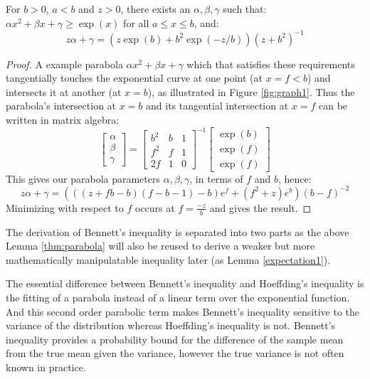 \begin{lemma}\label{thm:parabola}
For $b>0$, $a<b$ and $z>0$, there exists an $\alpha,\beta,\gamma$ such that: $\alpha x^2+\beta x+\gamma\ge \exp(x)$ for all $a\le x\le b$, and:
$$z\alpha+\gamma = (z\exp(b) + b^2\exp(-z/b))(z + b^2)^{-1}$$
\end{lemma}
\begin{proof}
A example parabola $\alpha x^2+\beta x+\gamma$ which that satisfies these requirements tangentially touches the exponential curve at one point (at $x=f<b$) and intersects it at another (at $x=b$), as illustrated in Figure \ref{fig:graph1}.
Thus the parabola's intersection at $x=b$ and its tangential intersection at $x=f$ can be written in matrix algebra:
$$
\begin{bmatrix}
    \alpha \\
    \beta \\
	\gamma
\end{bmatrix}
=
\begin{bmatrix}
    b^2 & b & 1 \\
    f^2 & f & 1 \\
	2f  & 1 & 0
\end{bmatrix}^{-1}
\begin{bmatrix}
    \exp(b) \\
    \exp(f) \\
	\exp(f)
\end{bmatrix}$$
This gives our parabola parameters $\alpha,\beta,\gamma$, in terms of $f$ and $b$, hence:
$$z\alpha+\gamma = (((z+fb-b)(f-b-1)-b)e^f+(f^2+z)e^b)(b-f)^{-2}$$
Minimizing with respect to $f$ occurs at $f=\frac{-z}{b}$ and gives the result.
\end{proof}




The derivation of Bennett's inequality is separated into two parts as the above Lemma \ref{thm:parabola} will also be reused to derive a weaker but more mathematically manipulatable inequality later (as Lemma \ref{expectation1}).

The essential difference between Bennett's inequality and Hoeffding's inequality is the fitting of a parabola instead of a linear term over the exponential function.
And this second order parabolic term makes Bennett's inequality sensitive to the variance of the distribution whereas Hoeffding's inequality is not.
Bennett's inequality provides a probability bound for the difference of the sample mean from the true mean given the variance, however the true variance is not often known in practice.


